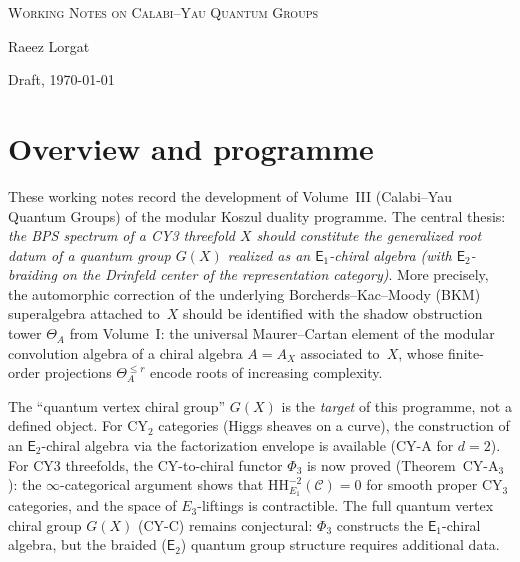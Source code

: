 \documentclass[11pt]{article}
\newcommand{\cC}{\mathcal{C}}
\newcommand{\Eone}{\mathsf{E}_1}
\newcommand{\Etwo}{\mathsf{E}_2}
\newcommand{\HH}{\mathrm{HH}}
\newcommand{\CY}{\mathrm{CY}}
\begin{document}
\begin{center}
 {\LARGE\scshape Working Notes on Calabi--Yau Quantum Groups}

 \bigskip

 {\large Raeez Lorgat}

 \medskip

 {\normalsize Draft, \today}
\end{center}

\tableofcontents

\section{Overview and programme}
\label{sec:programme}

These working notes record the development of Volume~III (Calabi--Yau Quantum Groups) of the modular Koszul duality programme. The central thesis: \emph{the BPS spectrum of a CY3 threefold $X$ should constitute the generalized root datum of a quantum group $G(X)$ realized as an $\Eone$-chiral algebra (with $\Etwo$-braiding on the Drinfeld center of the representation category)}. More precisely, the automorphic correction of the underlying Borcherds--Kac--Moody (BKM) superalgebra attached to~$X$ should be identified with the shadow obstruction tower $\Theta_A$ from Volume~I: the universal Maurer--Cartan element of the modular convolution algebra of a chiral algebra $A = A_X$ associated to~$X$, whose finite-order projections $\Theta_A^{\leq r}$ encode roots of increasing complexity.

\begin{warning}
\label{warn:gx-not-constructed}
The ``quantum vertex chiral group'' $G(X)$ is the \emph{target} of this programme, not a defined object. For $\CY_2$ categories (Higgs sheaves on a curve), the construction of an $\Etwo$-chiral algebra via the factorization envelope is available (CY-A for $d=2$). For CY3 threefolds, the CY-to-chiral functor $\Phi_3$ is now proved (Theorem~CY-A$_3$): the $\infty$-categorical argument shows that $\HH^{-2}_{E_1}(\cC) = 0$ for smooth proper CY$_3$ categories, and the space of $E_3$-liftings is contractible. The full quantum vertex chiral group $G(X)$ (CY-C) remains conjectural: $\Phi_3$ constructs the $\Eone$-chiral algebra, but the braided ($\Etwo$) quantum group structure requires additional data.
\end{warning}
\end{document}
